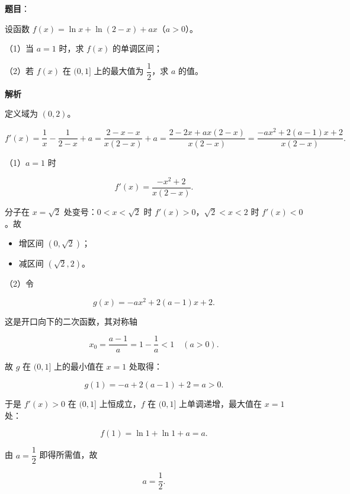 \begin{answer}

\textbf{题目}：

设函数 $f(x)=\ln x+\ln(2-x)+ax$（$a>0$）。

（1）当 $a=1$ 时，求 $f(x)$ 的单调区间；

（2）若 $f(x)$ 在 $(0,1]$ 上的最大值为 $\dfrac12$，求 $a$ 的值。

\textbf{解析}

定义域为 $(0,2)$。

\nopagebreak[4]
\[f'(x)=\frac1x-\frac1{2-x}+a
=\frac{2-x-x}{x(2-x)}+a
=\frac{2-2x+ax(2-x)}{x(2-x)}
=\frac{-ax^2+2(a-1)x+2}{x(2-x)}.\]

（1）$a=1$ 时

\nopagebreak[4]
\[f'(x)=\frac{-x^2+2}{x(2-x)}.\]

分子在 $x=\sqrt2$ 处变号：$0<x<\sqrt2$ 时 $f'(x)>0$，$\sqrt2<x<2$ 时 $f'(x)<0$。故

\begin{itemize}
\item 增区间 $(0,\sqrt2)$；
\item 减区间 $(\sqrt2,2)$。
\end{itemize}

（2）令

\nopagebreak[4]
\[g(x)=-ax^2+2(a-1)x+2.\]

这是开口向下的二次函数，其对称轴

\nopagebreak[4]
\[x_0=\frac{a-1}{a}=1-\frac1a<1\quad(a>0).\]

故 $g$ 在 $(0,1]$ 上的最小值在 $x=1$ 处取得：

\nopagebreak[4]
\[g(1)=-a+2(a-1)+2=a>0.\]

于是 $f'(x)>0$ 在 $(0,1]$ 上恒成立，$f$ 在 $(0,1]$ 上单调递增，最大值在 $x=1$ 处：

\nopagebreak[4]
\[f(1)=\ln1+\ln1+a=a.\]

由 $a=\dfrac12$ 即得所需值，故

\nopagebreak[4]
\[a=\frac12.\]


\end{answer}
